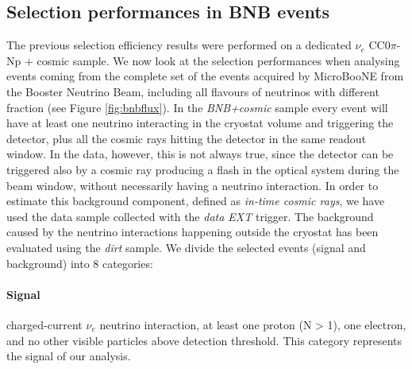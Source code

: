 \subsection{Selection performances in BNB events}\label{sec:numu}
The previous selection efficiency results were performed on a dedicated $\nu_{e}$ CC0$\pi$-Np + cosmic sample. We now look at the selection performances when analysing events coming from the complete set of the events acquired by MicroBooNE from the Booster Neutrino Beam, including all flavours of neutrinos with different fraction (see Figure \ref{fig:bnbflux}). In the \emph{BNB+cosmic} sample every event will have at least one neutrino interacting in the cryostat volume and triggering the detector, plus all the cosmic rays hitting the detector in the same readout window. In the data, however, this is not always true, since the detector can be triggered also by a cosmic ray producing a flash in the optical system during the beam window, without necessarily having a neutrino interaction. In order to estimate this background component, defined as \emph{in-time cosmic rays}, we have used the data sample collected with the \emph{data EXT} trigger.
The background caused by the neutrino interactions happening outside the cryostat has been evaluated using the \emph{dirt} sample.
We divide the selected events (signal and background) into 8 categories:
\paragraph{Signal}
\begin{description}[labelindent=1cm]
\item[Beam intrinsic $\nu_{e}$ CC$0\pi$-Np:] charged-current $\nu_{e}$ neutrino interaction, at least one proton (N > 1), one electron, and no other visible particles above detection threshold. This category represents the signal of our analysis.
\end{description}

